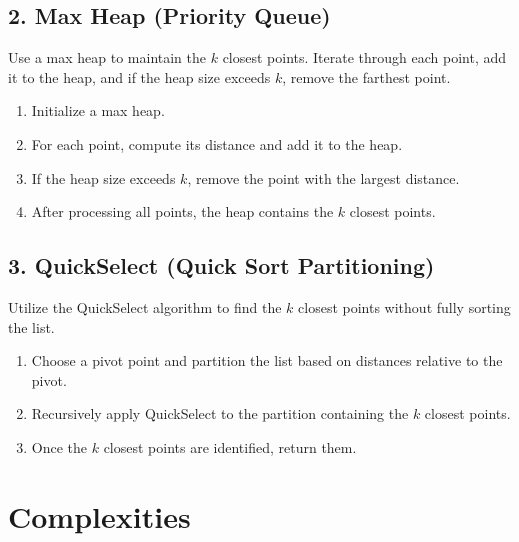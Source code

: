 \subsection*{2. Max Heap (Priority Queue)}

Use a max heap to maintain the \(k\) closest points. Iterate through each point, add it to the heap, and if the heap size exceeds \(k\), remove the farthest point.

\begin{enumerate}
    \item Initialize a max heap.
    \item For each point, compute its distance and add it to the heap.
    \item If the heap size exceeds \(k\), remove the point with the largest distance.
    \item After processing all points, the heap contains the \(k\) closest points.
\end{enumerate}

\subsection*{3. QuickSelect (Quick Sort Partitioning)}

Utilize the QuickSelect algorithm to find the \(k\) closest points without fully sorting the list.

\begin{enumerate}
    \item Choose a pivot point and partition the list based on distances relative to the pivot.
    \item Recursively apply QuickSelect to the partition containing the \(k\) closest points.
    \item Once the \(k\) closest points are identified, return them.
\end{enumerate}


\section*{Complexities}

